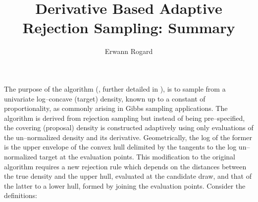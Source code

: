 \documentclass[11pt]{article}
\title{Derivative Based Adaptive Rejection Sampling: Summary}
\author{Erwann Rogard}
\begin{document}

\maketitle
The purpose of the algorithm (\cite{1992Gilks}, further detailed in \cite{1993Wild}), is to sample from a univariate log--concave (target) density, known up to a constant of proportionality, as commonly arising in Gibbs sampling applications. The algorithm is derived from rejection sampling but instead of being pre--specified, the covering (proposal) density is constructed adaptively using only evaluations of the un--normalized density and its derivative. Geometrically, the log of the former is the upper envelope of the convex hull delimited by the tangents to the log un--normalized target at the evaluation points. This modification to the original algorithm requires a new rejection rule which depends on the distances between the true density and the upper hull, evaluated at the candidate draw, and that of the latter to a lower hull, formed by joining the evaluation points. Consider the definitions:
\end{document}
